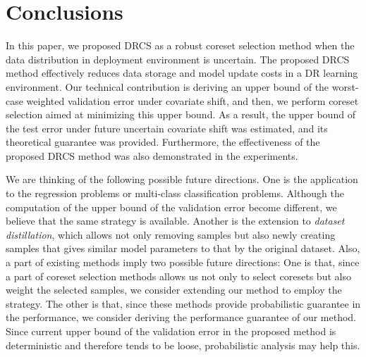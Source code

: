
\section{Conclusions}
\label{sec:conclusions}

%
In this paper, we proposed DRCS as a robust coreset selection method when the data distribution in deployment environment is uncertain.
%
The proposed DRCS method effectively reduces data storage and model update costs in a DR learning environment.
%
Our technical contribution is deriving an upper bound of the worst-case weighted validation error under covariate shift,
%
and then, we perform coreset selection aimed at minimizing this upper bound.
%
As a result, the upper bound of the test error under future uncertain covariate shift was estimated, and its theoretical guarantee was provided.
%
Furthermore, the effectiveness of the proposed DRCS method was also demonstrated in the experiments.

We are thinking of the following possible future directions.
%
One is the application to the regression problems or multi-class classification problems.
Although the computation of the upper bound of the validation error become different, we believe that the same strategy is available.
%
Another is the extension to {\em dataset distillation}, which allows not only removing samples but also newly creating samples that gives similar model parameters to that by the original dataset.
%
Also, a part of existing methods \citep{munteanu2018coresets,tukan2020coresets,tuka2021coresets,tolochinksy2022generic,alishahi2024dimensional} 
imply two possible future directions:
%
One is that, since a part of coreset selection methods allows us not only to select coresets but also weight the selected samples, we consider extending our method to employ the strategy.
%
The other is that, since these methods provide probabilistic guarantee in the performance, we consider deriving the performance guarantee of our method. Since current upper bound of the validation error in the proposed method is deterministic and therefore tends to be loose, probabilistic analysis may help this.
%
